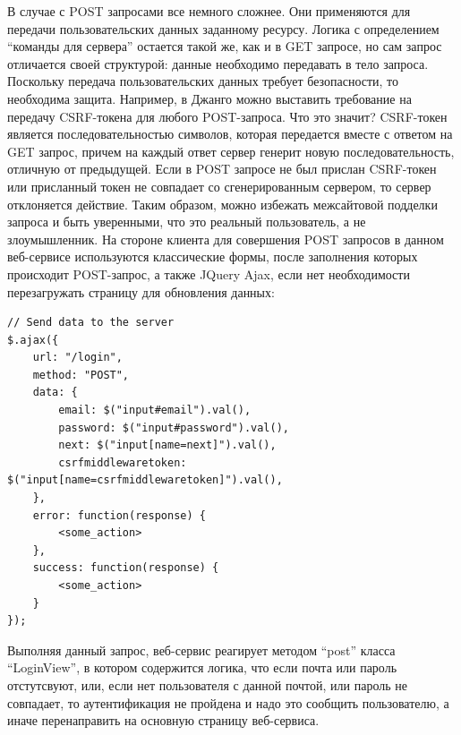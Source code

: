 В случае с POST запросами все немного сложнее. Они применяются для передачи пользовательских данных заданному ресурсу.
Логика с определением “команды для сервера” остается такой же, как и в GET запросе, но сам запрос отличается своей структурой:
данные необходимо передавать в тело запроса. Поскольку передача пользовательских данных требует безопасности, то
необходима защита. Например, в Джанго можно выставить требование на передачу CSRF-токена для любого POST-запроса.
Что это значит? CSRF-токен является последовательностью символов, которая передается вместе с ответом на GET запрос,
причем на каждый ответ сервер генерит новую последовательность, отличную от предыдущей. Если в POST запросе не был прислан
CSRF-токен или присланный токен не совпадает со сгенерированным сервером, то сервер отклоняется действие. Таким образом, можно
избежать межсайтовой подделки запроса и быть уверенными, что это реальный пользователь, а не злоумышленник.
На стороне клиента для совершения POST запросов в данном веб-сервисе используются
классические формы, после заполнения которых происходит POST-запрос, а также JQuery Ajax, если нет необходимости
перезагружать страницу для обновления данных:
\begin{lstlisting}[style=htmlcssjs]
// Send data to the server
$.ajax({
    url: "/login",
    method: "POST",
    data: {
        email: $("input#email").val(),
        password: $("input#password").val(),
        next: $("input[name=next]").val(),
        csrfmiddlewaretoken: $("input[name=csrfmiddlewaretoken]").val(),
    },
    error: function(response) {
        <some_action>
    },
    success: function(response) {
        <some_action>
    }
});
\end{lstlisting}
Выполняя данный запрос, веб-сервис реагирует методом “post” класса “LoginView”, в котором содержится логика, что
если почта или пароль отстутсвуют, или, если нет пользователя с данной почтой, или пароль не совпадает, то аутентификация не пройдена
и надо это сообщить пользователю, а иначе перенаправить на основную страницу веб-сервиса.

